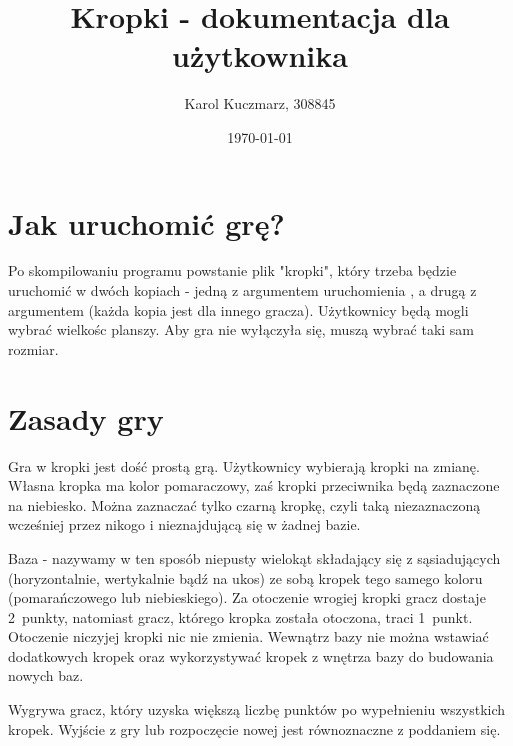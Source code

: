 \documentclass[a4paper]{article}
\author{Karol Kuczmarz, 308845}
\title{Kropki - dokumentacja dla użytkownika}
\date{\today}
\begin{document}
\maketitle
\section{Jak uruchomić grę?}
Po skompilowaniu programu powstanie plik "kropki", który trzeba będzie uruchomić w dwóch kopiach - jedną z argumentem uruchomienia , a drugą z argumentem  (każda kopia jest dla innego gracza). Użytkownicy będą mogli wybrać wielkośc planszy. Aby gra nie wyłączyła się, muszą wybrać taki sam rozmiar.
\section{Zasady gry}
Gra w kropki jest dość prostą grą. Użytkownicy wybierają kropki na zmianę. Własna kropka ma kolor pomaraczowy, zaś kropki przeciwnika będą zaznaczone na niebiesko. Można zaznaczać tylko czarną kropkę, czyli taką niezaznaczoną wcześniej przez nikogo i nieznajdującą się w żadnej bazie.

Baza - nazywamy w ten sposób niepusty wielokąt składający się z sąsiadujących (horyzontalnie, wertykalnie bądź na ukos) ze sobą kropek tego samego koloru (pomarańczowego lub niebieskiego). Za otoczenie wrogiej kropki gracz dostaje 2~punkty, natomiast gracz, którego kropka została otoczona, traci 1~punkt. Otoczenie niczyjej kropki nic nie zmienia. Wewnątrz bazy nie można wstawiać dodatkowych kropek oraz wykorzystywać kropek z wnętrza bazy do budowania nowych baz.

Wygrywa gracz, który uzyska większą liczbę punktów po wypełnieniu wszystkich kropek. Wyjście z gry lub rozpoczęcie nowej jest równoznaczne z poddaniem się.
\end{document}
